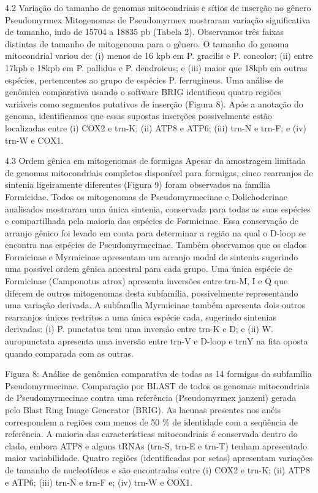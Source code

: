 \documentclass[../DISSERTACAO_MAIN.tex]{subfiles}
\begin{document}
\restoregeometry
	
	
	4.2 Variação do tamanho de genomas mitocondriais e sítios de inserção no gênero Pseudomyrmex
	Mitogenomas de Pseudomyrmex mostraram variação significativa de tamanho, indo de 15704 a 18835 pb (Tabela 2). Observamos três faixas distintas de tamanho de mitogenoma para o gênero. O tamanho do genoma mitocondrial variou de: (i) menos de 16 kpb em P. gracilis e P. concolor; (ii) entre 17kpb e 18kpb em P. pallidus e P. dendroicus; e (iii) maior que 18kpb em outras espécies, pertencentes ao grupo de espécies P. ferrugineus. Uma análise de genômica comparativa usando o software BRIG identificou quatro regiões variáveis como segmentos putativos de inserção (Figura 8). Após a anotação do genoma, identificamos que essas supostas inserções possivelmente estão localizadas entre (i) COX2 e trn-K; (ii) ATP8 e ATP6; (iii) trn-N e trn-F; e (iv) trn-W e COX1.
	
	4.3 Ordem gênica em mitogenomas de formigas
	Apesar da amostragem limitada de genomas mitocondriais completos disponível para formigas, cinco rearranjos de sintenia ligeiramente diferentes (Figura 9) foram observados na família Formicidae. Todos os mitogenomas de Pseudomyrmecinae e Dolichoderinae analisados mostraram uma única sintenia, conservada para todas as suas espécies e compartilhada pela maioria das espécies de Formicinae. Essa conservação de arranjo gênico foi levado em conta para determinar a região na qual o  D-loop se encontra nas espécies de Pseudomyrmecinae. Também observamos que os clados Formicinae e Myrmicinae apresentam um arranjo modal de sintenia sugerindo uma possível ordem gênica ancestral para cada grupo. Uma única espécie de Formicinae (Camponotus atrox) apresenta inversões entre trn-M, I e Q que diferem de outros mitogenomas desta subfamília, possivelmente representando uma variação derivada. A subfamília Myrmicinae também apresenta dois outros rearranjos únicos restritos a uma única espécie cada, sugerindo sintenias derivadas: (i) P. punctatus tem uma inversão entre trn-K e D; e (ii) W. auropunctata apresenta uma inversão entre trn-V e D-loop e trnY na fita oposta quando comparada com as outras. 
	
	
	
	
	Figura 8: Análise de genômica comparativa de todas as 14 formigas da subfamília Pseudomyrmecinae.
	Comparação por BLAST de todos os genomas mitocondriais de Pseudomyrmecinae contra uma referência (Pseudomyrmex janzeni) gerada pelo Blast Ring Image Generator (BRIG). As lacunas presentes nos anéis correspondem a regiões com menos de 50 \% de identidade com a seqüência de referência. A maioria das características mitocondriais é conservada dentro do clado, embora ATP8 e alguns tRNAs (trn-S, trn-E e trn-T) tenham apresentado maior variabilidade. Quatro regiões (identificadas por setas) apresentam variações de tamanho de nucleotídeos e são encontradas entre (i) COX2 e trn-K; (ii) ATP8 e ATP6; (iii) trn-N e trn-F e; (iv) trn-W e COX1.
	
\end{document}
